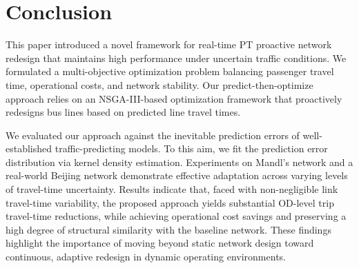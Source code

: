 \documentclass[a4paper,fleqn]{cas-sc}
\begin{document}
\section{Conclusion}\label{sec:conclu}
This paper introduced a novel framework for real-time PT proactive network redesign that maintains high performance under uncertain traffic conditions. We formulated a multi-objective optimization problem balancing passenger travel time, operational costs, and network stability. Our predict-then-optimize approach relies on an NSGA-III-based optimization framework that proactively redesigns bus lines based on predicted line travel times. 

We evaluated our approach against the inevitable prediction errors of well-established traffic-predicting models. To this aim, we fit the prediction error distribution via kernel density estimation.
Experiments on Mandl's network and a real-world Beijing network demonstrate effective adaptation across varying levels of travel-time uncertainty. 
%
Results indicate that, faced with non-negligible link travel-time variability, the proposed approach yields substantial OD-level trip travel-time reductions, while achieving operational cost savings and preserving a high degree of structural similarity with the baseline network.
%
These findings highlight the importance of moving beyond static network design toward continuous, adaptive redesign in dynamic operating environments.



\end{document}
